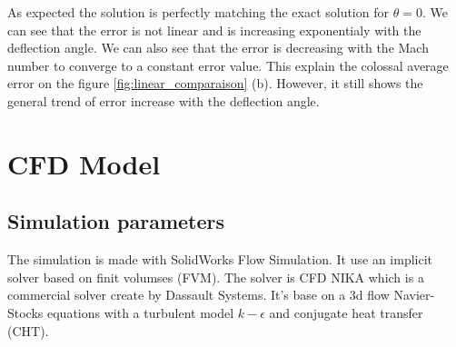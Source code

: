 As expected the solution is perfectly matching the exact solution for $\theta=0$. We can see that the error is not linear and is increasing exponentialy with the deflection angle. We can also see that the error is decreasing with the Mach number to converge to a constant error value. This explain the colossal average error on the figure \ref{fig:linear_comparaison} (b). However, it still shows the general trend of error increase with the deflection angle.

\newpage
\section{CFD Model}
\subsection{Simulation parameters}
\label{subsec:simulation_parameters}

The simulation is made with SolidWorks Flow Simulation. It use an implicit solver based on finit volumses (FVM). The solver is CFD NIKA which is a commercial solver create by Dassault Systems. It's base on a 3d flow Navier-Stocks equations with a turbulent model $k-\epsilon$ and conjugate heat transfer (CHT).

